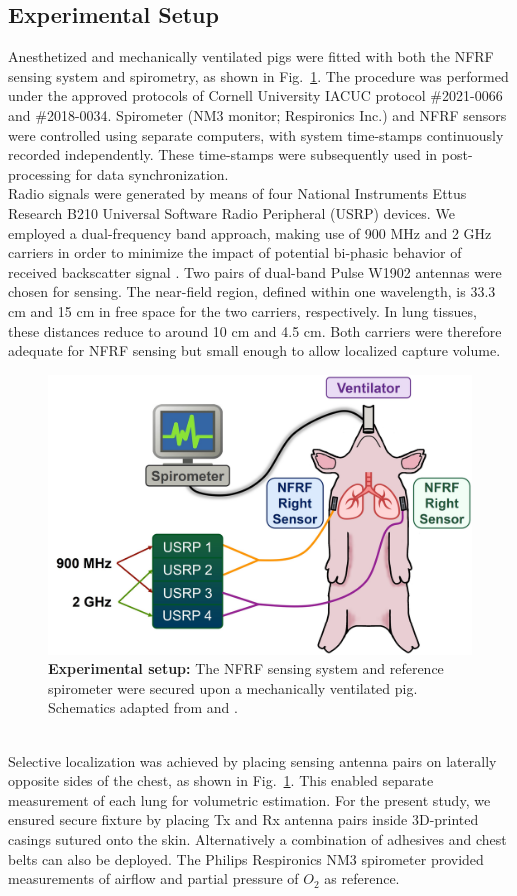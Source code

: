 \documentclass[journal]{IEEEtran}
\begin{document}
\subsection{Experimental Setup}
Anesthetized and mechanically ventilated pigs were fitted with both the NFRF sensing system and spirometry, as shown in Fig.~\ref{fig:setup}. The procedure was performed under the approved protocols of Cornell University IACUC protocol \#2021-0066 and \#2018-0034. Spirometer (NM3 monitor; Respironics Inc.) and NFRF sensors were controlled using separate computers, with system time-stamps continuously recorded independently. These time-stamps were subsequently used in post-processing for data synchronization. \\
Radio signals were generated by means of four National Instruments Ettus Research B210 Universal Software Radio Peripheral (USRP) devices. We employed a dual-frequency band approach, making use of 900 MHz and 2 GHz carriers in order to minimize the impact of potential bi-phasic behavior of received backscatter signal \cite{zhouBackscatterFieldModel2023}. Two pairs of dual-band Pulse W1902 antennas were chosen for sensing. The near-field region, defined within one wavelength, is 33.3 cm and 15 cm in free space for the two carriers, respectively. In lung tissues, these distances reduce to around 10 cm and 4.5 cm. Both carriers were therefore adequate for NFRF sensing but small enough to allow localized capture volume. 
\begin{figure}[htbp]
\centering
\includegraphics[width=.49\textwidth]{setup_v4.jpg}
\caption{\textbf{Experimental setup:} The NFRF sensing system and reference spirometer were secured upon a mechanically ventilated pig. Schematics adapted from \cite{lungImage} and \cite{heartMonitor}.}
\label{fig:setup}
\end{figure}
\\Selective localization was achieved by placing sensing antenna pairs on laterally opposite sides of the chest, as shown in Fig.~\ref{fig:setup}. This enabled separate measurement of each lung for volumetric estimation. For the present study, we ensured secure fixture by placing Tx and Rx antenna pairs inside 3D-printed casings sutured onto the skin. Alternatively a combination of adhesives and chest belts can also be deployed. The Philips Respironics NM3 spirometer provided measurements of airflow and partial pressure of $O_{2}$ as reference. 
\end{document}
